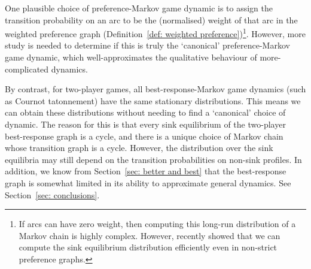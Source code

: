 \documentclass[preprint,authoryear]{elsarticle}
\begin{document}
One plausible choice of preference-Markov game dynamic \citep{papadimitriou_game_2019,hakim2024swim} is to assign the transition probability on an arc to be the (normalised) weight of that arc in the weighted preference graph (Definition~\ref{def: weighted preference})\footnote{If arcs can have zero weight, then computing this long-run distribution of a Markov chain is highly complex. However, \cite{hakim2024swim} recently showed that we can compute the sink equilibrium distribution efficiently even in non-strict preference graphs.}. However, more study is needed to determine if this is truly the `canonical' preference-Markov game dynamic, which well-approximates the qualitative behaviour of more-complicated dynamics.

By contrast, for two-player games, all best-response-Markov game dynamics (such as Cournot tatonnement) have the same stationary distributions. This means we can obtain these distributions without needing to find a `canonical' choice of dynamic. The reason for this is that every sink equilibrium of the two-player best-response graph is a cycle, and there is a unique choice of Markov chain whose transition graph is a cycle. However, the distribution over the sink equilibria may still depend on the transition probabilities on non-sink profiles. In addition, we know from Section~\ref{sec: better and best} that the best-response graph is somewhat limited in its ability to approximate general dynamics. See Section~\ref{sec: conclusions}.



\end{document}
